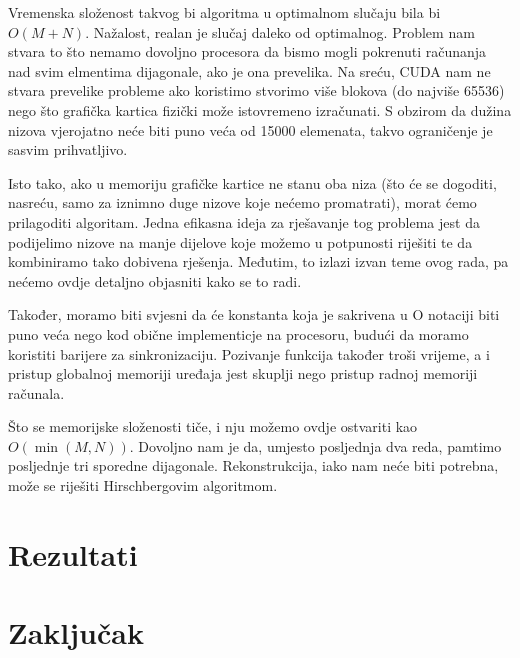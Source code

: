 \documentclass[times, utf8, zavrsni]{fer}
\begin{document}

Vremenska složenost takvog bi algoritma u optimalnom slučaju bila
bi $O(M+N)$. Nažalost, realan je slučaj daleko od optimalnog. 
Problem nam stvara to što nemamo dovoljno procesora da bismo
mogli pokrenuti računanja nad svim elmentima dijagonale, ako je
ona prevelika. Na sreću, CUDA nam ne stvara prevelike probleme
ako koristimo stvorimo više blokova (do najviše 65536) nego što
grafička kartica fizički može istovremeno izračunati. S obzirom
da dužina nizova vjerojatno neće biti puno veća od 15000 elemenata, 
takvo ograničenje je sasvim prihvatljivo.

Isto tako, ako u memoriju grafičke kartice ne stanu
oba niza (što će se dogoditi, nasreću, samo za iznimno
duge nizove koje nećemo promatrati), morat ćemo prilagoditi
algoritam. Jedna efikasna ideja
za rješavanje tog problema jest da podijelimo nizove na manje
dijelove koje možemo u potpunosti riješiti te da kombiniramo
tako dobivena rješenja. 
Međutim, to izlazi izvan teme ovog rada, pa nećemo
ovdje detaljno objasniti kako se to radi.

Također, moramo biti svjesni da će konstanta koja je sakrivena u O
notaciji biti puno veća nego kod obične implementicje na procesoru,
budući da moramo koristiti barijere za sinkronizaciju. Pozivanje
funkcija također troši vrijeme, a i pristup globalnoj memoriji
uređaja jest skuplji nego pristup radnoj memoriji računala. 

Što se memorijske složenosti tiče, i nju možemo ovdje ostvariti
kao $O(\min(M,N))$. Dovoljno nam je da, umjesto posljednja dva reda,
pamtimo posljednje tri sporedne dijagonale. Rekonstrukcija, iako
nam neće biti potrebna, može se riješiti Hirschbergovim algoritmom. 


\chapter{Rezultati}







\chapter{Zaključak}
\end{document}
